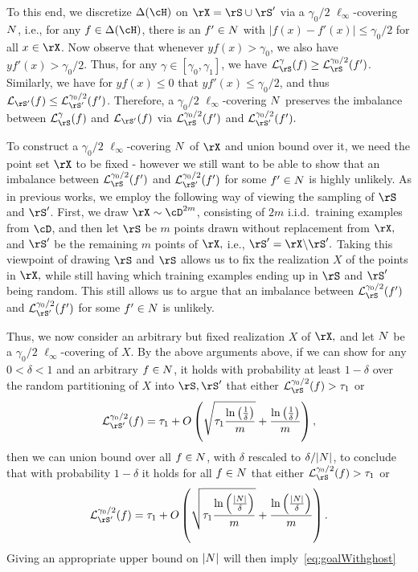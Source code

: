 To this end, we discretize $\dlh$ on $ \rX=\rS\cup\rS' $  via a $\gamma_0/2$ $\ell_\infty$-covering $ N $, i.e., for any $f \in \dlh$, there is an $f' \in N$ with $|f(x)-f'(x)| \leq \gamma_0/2$ for all $x\in \rX$. Now observe that whenever $yf(x) > \gamma_0$, we also have $yf'(x) > \gamma_0/2$. Thus, for any $\gamma \in [\gamma_0,\gamma_1]$, we have $\ls_{\rS}^\gamma(f) \geq \ls_{\rS}^{\gamma_0/2}(f')$. Similarly, we have for $yf(x) \leq 0$ that $yf'(x) \leq \gamma_0/2$, and thus $\ls_{\rS'}(f) \leq \ls_{\rS'}^{\gamma_0/2}(f')$. Therefore, a $\gamma_0/2$ $\ell_\infty$-covering $ N $ preserves the imbalance between $ \ls_{\rS}^{\gamma}(f) $ and $ \ls_{\rS'}(f)$ via $ \ls_{\rS}^{\gamma_0/2}(f') $ and $ \ls_{\rS'}^{\gamma_0/2}(f').$   
 
To construct a $\gamma_0/2$ $\ell_\infty$-covering $ N $ of $ \rX $ and union bound over it, we need the point set $ \rX $ to be fixed - however we still want to be able to show that an imbalance between $ \ls_{\rS}^{\gamma_0/2}(f') $ and $ \ls_{\rS'}^{\gamma_0/2}(f')$ for some $ f'\in N$ is highly unlikely. As in previous works, we employ the following way of viewing the sampling of $ \rS $ and $ \rS'$. First, we draw $ \rX\sim \cD^{2m} $, consisting of $ 2m $ i.i.d.\ training examples from $ \cD $, and then let $ \rS $ be $ m $ points drawn without replacement from $ \rX,$ and $ \rS' $ be the remaining $ m $  points of $ \rX,$ i.e., $ \rS'=\rX\backslash \rS'.$ Taking this viewpoint of drawing $ \rS $ and $ \rS $ allows us to fix the realization $ X $ of the points in $ \rX,$ while still having which training examples ending up in $ \rS $ and $ \rS' $ being random. This still allows us to argue that an imbalance between $ \ls_{\rS}^{\gamma_0/2}(f') $ and $ \ls_{\rS'}^{\gamma_0/2}(f')$ for some $ f'\in N$ is unlikely.
              
Thus, we now consider an arbitrary but fixed realization $ X $ of $ \rX, $ and let $ N $ be a $\gamma_0/2$ $\ell_\infty$-covering of $ X. $ By the above arguments above, if we can show for any $0 < \delta < 1$ and an arbitrary $f\in N $, it holds with probability at least $1-\delta$ over the random partitioning of $X$ into $\rS, \rS'$ that either $\ls_{\rS}^{\gamma_0/2}(f) > \tau_1$ or
 \begin{align}\label{eq:proofsketch6}
  \ls^{\gamma_{0}/2}_{\rS'}(f) = \tau_{1}+O\left(\sqrt{\tau_{1}\frac{\ln{\left(\frac{1}{\delta}\right)}}{m} }+\frac{\ln{\left(\frac{1}{\delta}\right)}}{m} \right),
 \end{align}
 then we can union bound over all $f \in N$, with $\delta$ rescaled to $\delta/|N|$, to conclude that with probability $1-\delta$ it holds for all $f \in N$ that either $\ls_{\rS}^{\gamma_0/2}(f) > \tau_1$ or
 \begin{align*}
  \ls^{\gamma_{0}/2}_{\rS'}(f) = \tau_{1}+O\left(\sqrt{\tau_{1}\frac{\ln{\left(\frac{|\Net|}{\delta}\right)}}{m} }+\frac{\ln{\left(\frac{|\Net|}{\delta}\right)}}{m} \right).
 \end{align*}
Giving an appropriate upper bound on $|N|$ will then imply~\cref{eq:goalWithghost}
 
